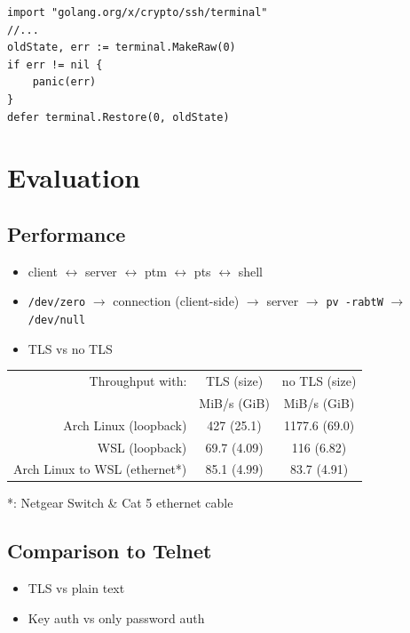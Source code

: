 \documentclass[
	xcolor=dvipsnames,
]{beamer}
\newenvironment{zhawframe}[1][]
{\begin{frame}[environment=fr,#1]{\insertsectionhead}{\insertsubsectionhead}}
{\end{frame}
}
\begin{document}
\begin{frame}[fragile]{\insertsectionhead}{\insertsubsectionhead}
\lstset{
	style = basestyle,
	language = Golang,
}
\begin{lstlisting}
import "golang.org/x/crypto/ssh/terminal"
//...
oldState, err := terminal.MakeRaw(0)
if err != nil {
    panic(err)
}
defer terminal.Restore(0, oldState)
\end{lstlisting}
\end{frame}

\section{Evaluation}
\subsection{Performance}
\begin{zhawframe}
\begin{itemize}
\item<1-> client \textcolor{green!60!blue}{$\leftrightarrow$} server $\leftrightarrow$ ptm $\leftrightarrow$ pts $\leftrightarrow$ shell
\item<2-> \texttt{/dev/zero} $\rightarrow$ connection (client-side) $\rightarrow$ server $\rightarrow$ \texttt{pv -rabtW} $\rightarrow$ \texttt{/dev/null}
\item<3-> TLS vs no TLS
\end{itemize}
\begin{table}[ht]
\centering
\begin{tabular}{rcc}
Throughput with:				& TLS (size)	& no TLS (size)\\
								& MiB/s (GiB)	& MiB/s (GiB)\\\hline
Arch Linux (loopback) 			& 427 (25.1)	& 1177.6 (69.0)\\
WSL (loopback) 					& 69.7 (4.09)	& 116 (6.82)\\
Arch Linux to WSL (ethernet*) 	& 85.1 (4.99)	& 83.7 (4.91)
\end{tabular}
\end{table}
*: Netgear Switch \& Cat 5 ethernet cable
\end{zhawframe}

\subsection{Comparison to Telnet}
\begin{zhawframe}
\begin{itemize}
\item<1-> TLS vs plain text
\item<2-> Key auth vs only password auth
\end{itemize}
\end{zhawframe}
\end{document}

